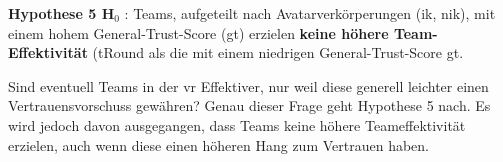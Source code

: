 \documentclass[a4paper,11pt]{article}%
\renewcommand{\\}{\vspace*{0.5\baselineskip} \newline}
\begin{document}
\textbf{Hypothese 5 H$_{0}$} : Teams, aufgeteilt nach Avatarverkörperungen (\ac{ik}, \ac{nik}), mit einem hohem General-Trust-Score (\ac{gt}) erzielen \textbf{keine höhere Team-Effektivität} (\ac{tRound} als die mit einem niedrigen General-Trust-Score \ac{gt}. \newline

Sind eventuell Teams in der \ac{vr} Effektiver, nur weil diese generell leichter einen Vertrauensvorschuss gewähren? Genau dieser Frage geht Hypothese 5 nach. Es wird jedoch davon ausgegangen, dass Teams keine höhere Teameffektivität erzielen, auch wenn diese einen höheren Hang zum Vertrauen haben.
	
%	
\end{document}
